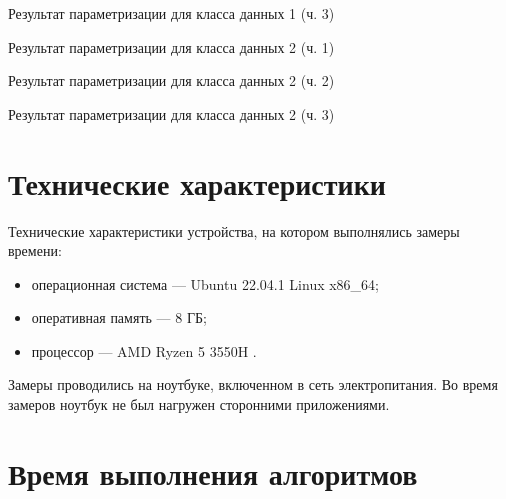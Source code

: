 \begin{table}[h!]
	\caption{Результат параметризации для класса данных 1 (ч. 3)}
	\label{tbl:3}
	\begin{center}
	\end{center}
\end{table}
\newpage 

\begin{table}[h!]
	\caption{Результат параметризации для класса данных 2 (ч. 1)}
	\label{tbl:4}
	\begin{center}
	\end{center}
\end{table}
\newpage 

\begin{table}[h!]
	\caption{Результат параметризации для класса данных 2 (ч. 2)}
	\label{tbl:5}
	\begin{center}
	\end{center}
\end{table}
\newpage 

\begin{table}[h!]
	\caption{Результат параметризации для класса данных 2 (ч. 3)}
	\label{tbl:6}
	\begin{center}
	\end{center}
\end{table}
\clearpage 

\section{Технические характеристики}

Технические характеристики устройства, на котором выполнялись замеры времени:

\begin{itemize}
	\item операционная система --- Ubuntu 22.04.1 Linux x86\_64;
	\item оперативная память --- 8 ГБ;
	\item процессор --- AMD Ryzen 5 3550H \cite{amd}.
\end{itemize}

Замеры проводились на ноутбуке, включенном в сеть электропитания.
Во время замеров ноутбук не был нагружен сторонними приложениями.

\section{Время выполнения алгоритмов}

